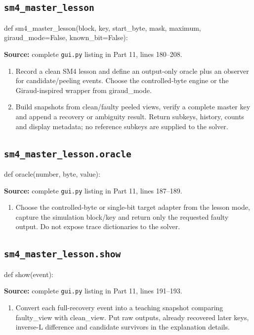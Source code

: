 \subsection{\texttt{sm4\_\allowbreak{}master\_\allowbreak{}lesson}}
\begin{lightcode}
def sm4_master_lesson(block, key, start_byte, mask, maximum, giraud_mode=False, known_bit=False):
\end{lightcode}
\noindent\textbf{Source:} complete \texttt{gui.py} listing in Part 11, lines 180--208.
\begin{enumerate}
\item Record a clean SM4 lesson and define an output-only oracle plus an observer for candidate/peeling events. Choose the controlled-byte engine or the Giraud-inspired wrapper from giraud\_mode.
\item Build snapshots from clean/faulty peeled views, verify a complete master key and append a recovery or ambiguity result. Return subkeys, history, counts and display metadata; no reference subkeys are supplied to the solver.
\end{enumerate}
\subsection{\texttt{sm4\_\allowbreak{}master\_\allowbreak{}lesson.oracle}}
\begin{lightcode}
def oracle(number, byte, value):
\end{lightcode}
\noindent\textbf{Source:} complete \texttt{gui.py} listing in Part 11, lines 187--189.
\begin{enumerate}
\item Choose the controlled-byte or single-bit target adapter from the lesson mode, capture the simulation block/key and return only the requested faulty output. Do not expose trace dictionaries to the solver.
\end{enumerate}
\subsection{\texttt{sm4\_\allowbreak{}master\_\allowbreak{}lesson.show}}
\begin{lightcode}
def show(event):
\end{lightcode}
\noindent\textbf{Source:} complete \texttt{gui.py} listing in Part 11, lines 191--193.
\begin{enumerate}
\item Convert each full-recovery event into a teaching snapshot comparing faulty\_view with clean\_view. Put raw outputs, already recovered later keys, inverse-L difference and candidate survivors in the explanation details.
\end{enumerate}
